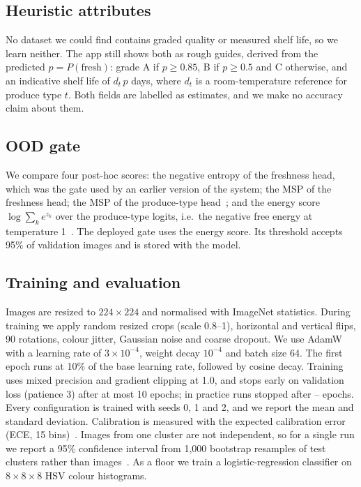 \documentclass[conference]{IEEEtran}
\begin{document}
\subsection{Heuristic attributes}
No dataset we could find contains graded quality or measured shelf life, so we
learn neither. The app still shows both as rough guides, derived from the
predicted $p=P(\text{fresh})$: grade A if $p\ge0.85$, B if $p\ge0.5$ and C
otherwise, and an indicative shelf life of $d_t\,p$ days, where $d_t$ is a
room-temperature reference for produce type $t$. Both fields are labelled as
estimates, and we make no accuracy claim about them.

\subsection{OOD gate}
We compare four post-hoc scores: the negative entropy of the freshness head,
which was the gate used by an earlier version of the system; the MSP of the
freshness head; the MSP of the produce-type head~\cite{hendrycks2017baseline};
and the energy score $\log\sum_k e^{z_k}$ over the produce-type logits, i.e.\ the
negative free energy at temperature 1~\cite{liu2020energy}. The deployed gate
uses the energy score. Its threshold accepts 95\% of validation images and is
stored with the model.

\subsection{Training and evaluation}
Images are resized to $224\times224$ and normalised with ImageNet statistics.
During training we apply random resized crops (scale 0.8--1), horizontal and
vertical flips, 90\textdegree{} rotations, colour jitter, Gaussian noise and
coarse dropout. We use AdamW~\cite{loshchilov2019adamw} with a learning rate of
$3\times10^{-4}$, weight decay $10^{-4}$ and batch size 64. The first epoch runs
at 10\% of the base learning rate, followed by cosine decay. Training uses mixed
precision and gradient clipping at 1.0, and stops early on validation loss
(patience 3) after at most 10 epochs; in practice runs stopped after
\EpochsMin--\EpochsMax{} epochs. Every configuration is trained with seeds 0, 1
and 2, and we report the mean and standard deviation. Calibration is measured
with the expected calibration error (ECE, 15 bins)~\cite{guo2017calibration}.
Images from one cluster are not independent, so for a single run we report a
95\% confidence interval from 1,000 bootstrap resamples of test clusters rather
than images~\cite{efron1994bootstrap}. As a floor we train a logistic-regression
classifier on $8\times8\times8$ HSV colour histograms.
\end{document}
